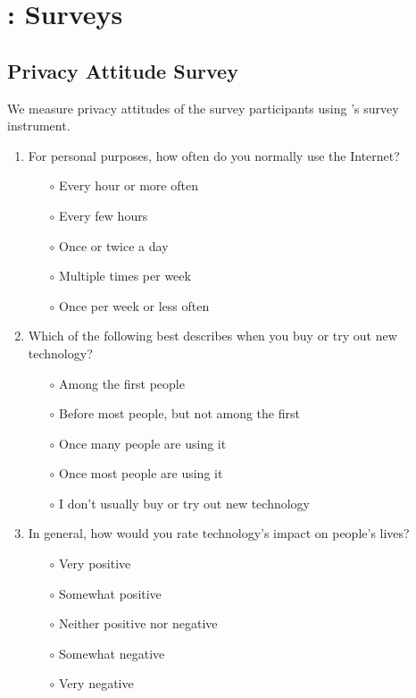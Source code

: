 \chapter{\frameworkAinur: Surveys}
\label{app:ainur-survey}

\section{Privacy Attitude Survey}
\label{appsec:privacy-attitude-survey}

We measure privacy attitudes of the survey participants using \citep{schnorf2014comparison}'s survey instrument.

\begin{enumerate}

\item For personal purposes, how often do you normally use the Internet?

\begin{itemize}
\item[$\circ$] Every hour or more often
\item[$\circ$] Every few hours
\item[$\circ$] Once or twice a day
\item[$\circ$] Multiple times per week
\item[$\circ$] Once per week or less often
\end{itemize}

\item Which of the following best describes when you buy or try out new technology?

\begin{itemize}
\item[$\circ$] Among the first people
\item[$\circ$] Before most people, but not among the first
\item[$\circ$] Once many people are using it
\item[$\circ$] Once most people are using it
\item[$\circ$] I don't usually buy or try out new technology
\end{itemize}

\item In general, how would you rate technology's impact on people's lives?

\begin{itemize}
\item[$\circ$] Very positive
\item[$\circ$] Somewhat positive
\item[$\circ$] Neither positive nor negative
\item[$\circ$] Somewhat negative
\item[$\circ$] Very negative
\end{itemize}


\end{enumerate}
